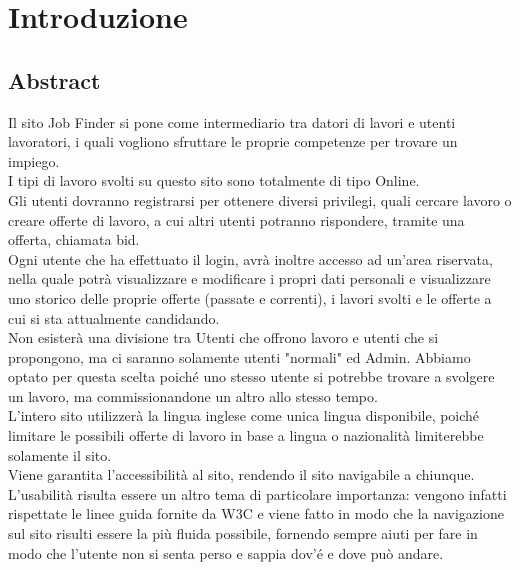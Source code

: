 \section{Introduzione}
	\subsection{Abstract}
	Il sito Job Finder si pone come intermediario tra datori di lavori e utenti lavoratori, i quali vogliono sfruttare le proprie competenze per trovare un impiego.\\
  I tipi di lavoro svolti su questo sito sono totalmente di tipo Online. \\
	Gli utenti dovranno registrarsi per ottenere diversi privilegi, quali cercare lavoro o creare offerte di lavoro, a cui altri utenti potranno rispondere, tramite una offerta, chiamata bid.\\
  Ogni utente che ha effettuato il login, avrà inoltre accesso ad un'area riservata, nella quale potrà visualizzare e modificare i propri dati personali e visualizzare uno storico delle proprie offerte (passate e correnti), i lavori svolti e le offerte a cui si sta attualmente candidando.\\
  Non esisterà una divisione tra Utenti che offrono lavoro e utenti che si propongono, ma ci saranno solamente utenti "normali" ed Admin. Abbiamo optato per questa scelta poiché uno stesso utente si potrebbe trovare a svolgere un lavoro, ma commissionandone un altro allo stesso tempo.\\
  L'intero sito utilizzerà la lingua inglese come unica lingua disponibile, poiché limitare le possibili offerte di lavoro in base a lingua o nazionalità limiterebbe solamente il sito. \\
  Viene garantita l’accessibilità al sito, rendendo il sito navigabile a chiunque.\\
  L’usabilità risulta essere un altro tema di particolare importanza: vengono infatti rispettate le linee guida fornite da W3C e viene fatto in modo che la navigazione sul sito risulti essere la più fluida possibile, fornendo sempre aiuti per fare in modo che l’utente non si senta perso e sappia dov'é e dove può andare.
	